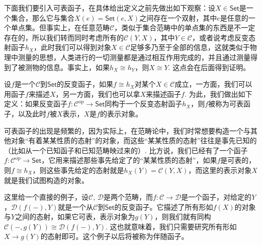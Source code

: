 

下面我们要引入可表函子，在具体给出定义之前先做出如下观察：设$X\in\mathsf{Set}$是一个集合，那么它与集合$X(e)={\mathsf{Set}}(e,X)$之间存在一个双射，其中$e$是任意的一个单点集。但事实上，在任意范畴$\mathcal{C}$，类似于集合范畴中的单点集的东西是不一定存在的，所以我们转而同时考虑所有的${\mathcal{C}}(Y,X)$，其中$Y\in \mathcal{C}$，或者说考虑反变态射函子$h_X$，此时我们可以得到对象$X\in \mathcal{C}$足够多乃至于全部的信息，这就类似于物理中测量的思想，人类进行的一切测量都是通过相互作用完成的，并且通过测量得到了被测物的信息。事实上，如果$h_X\cong h_Y$，则$X\cong Y$. 这点会在后面得到证明。

{\para[可表函子] 
设$f$是一个$\mathcal{C}$到$\mathsf{Set}$的反变函子，如果$f\cong h_X$对某个$X\in \mathcal{C}$成立，一方面，我们可以用函子$f$来描述$X$，另一方面，我们也可以拿$X$来描述函子$f$. 为此，我们做出如下定义：如果反变函子$f:\mathcal{C}^{\text{op}}\to \mathsf{Set}$同构于一个反变态射函子$h_X$，则$f$被称为可表函子，以及此时$f$被$X$表示，$X$是$f$的表示对象。
\endpara}

可表函子的出现是频繁的，因为实际上，在范畴论中，我们时常想要构造一个与其他对象“有着某某性质的态射”的对象，而这些“某某性质的态射”往往是事先已知的（比如从一个已知函子和已知范畴映过来的）. 比方说，我们已经有了一个函子$f:\mathcal{C}^\text{op}\to\mathsf{Set}$，它用来描述那些事先给定了的“某某性质的态射”，如果$f$是可表的，则$f\cong h_X$，则这些事先给定的态射就是$h_X(Y)=\mathcal{C}(Y,X)$，而这里的表示对象$X$就是我们试图构造的对象。

这里给一个直接的例子，设$\mathcal{C}$, $\mathcal{D}$是两个范畴，而$f:\mathcal{C}\to \mathcal{D}$是一个函子，对给定的$Y$，$\mathcal{D}(f(-),Y)$就是一个从$\mathcal{C}$到$\mathsf{Set}$的反变函子。它描述了所有形如$f(X)$的对象与$Y$之间的态射，如果它可表，表示对象为$g(Y)$，则我们就有同构$\mathcal{C}(-,g(Y))\cong \mathcal{D}(f(-),Y)$. 这也就意味着，我们只需要研究所有形如$X\to g(Y)$的态射即可。这个例子以后将被称为伴随函子。

